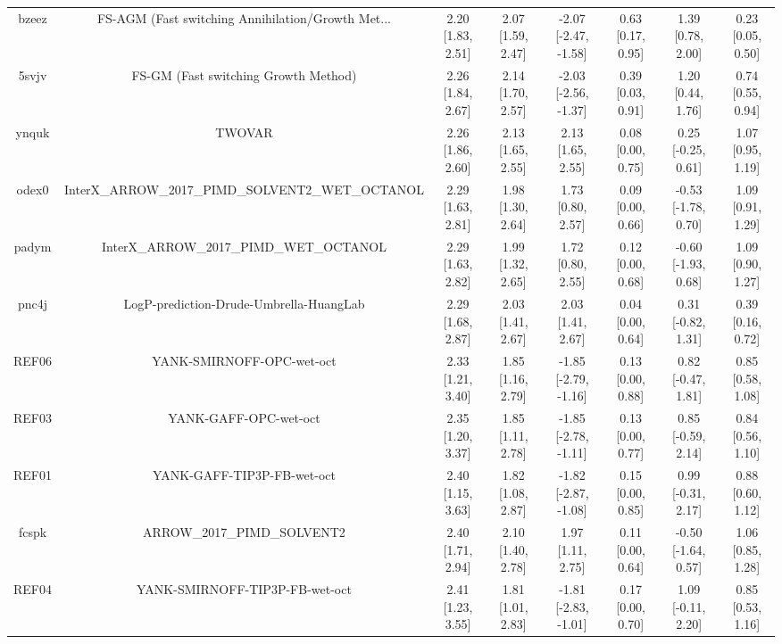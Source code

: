\documentclass{article}
\begin{document}
\begin{center}
\begin{longtable}{|cccccccc|}
 bzeez &  FS-AGM (Fast switching Annihilation/Growth Met... &  2.20 [1.83, 2.51] &  2.07 [1.59, 2.47] &  -2.07 [-2.47, -1.58] &  0.63 [0.17, 0.95] &    1.39 [0.78, 2.00] &     0.23 [0.05, 0.50] \\
 5svjv &               FS-GM (Fast switching Growth Method) &  2.26 [1.84, 2.67] &  2.14 [1.70, 2.57] &  -2.03 [-2.56, -1.37] &  0.39 [0.03, 0.91] &    1.20 [0.44, 1.76] &     0.74 [0.55, 0.94] \\
 ynquk &                                             TWOVAR &  2.26 [1.86, 2.60] &  2.13 [1.65, 2.55] &     2.13 [1.65, 2.55] &  0.08 [0.00, 0.75] &   0.25 [-0.25, 0.61] &     1.07 [0.95, 1.19] \\
 odex0 &  InterX\_ARROW\_2017\_PIMD\_SOLVENT2\_WET\_OCTANOL &  2.29 [1.63, 2.81] &  1.98 [1.30, 2.64] &     1.73 [0.80, 2.57] &  0.09 [0.00, 0.66] &  -0.53 [-1.78, 0.70] &     1.09 [0.91, 1.29] \\
 padym &            InterX\_ARROW\_2017\_PIMD\_WET\_OCTANOL &  2.29 [1.63, 2.82] &  1.99 [1.32, 2.65] &     1.72 [0.80, 2.55] &  0.12 [0.00, 0.68] &  -0.60 [-1.93, 0.68] &     1.09 [0.90, 1.27] \\
 pnc4j &            LogP-prediction-Drude-Umbrella-HuangLab &  2.29 [1.68, 2.87] &  2.03 [1.41, 2.67] &     2.03 [1.41, 2.67] &  0.04 [0.00, 0.64] &   0.31 [-0.82, 1.31] &     0.39 [0.16, 0.72] \\
 REF06 &                          YANK-SMIRNOFF-OPC-wet-oct &  2.33 [1.21, 3.40] &  1.85 [1.16, 2.79] &  -1.85 [-2.79, -1.16] &  0.13 [0.00, 0.88] &   0.82 [-0.47, 1.81] &     0.85 [0.58, 1.08] \\
 REF03 &                              YANK-GAFF-OPC-wet-oct &  2.35 [1.20, 3.37] &  1.85 [1.11, 2.78] &  -1.85 [-2.78, -1.11] &  0.13 [0.00, 0.77] &   0.85 [-0.59, 2.14] &     0.84 [0.56, 1.10] \\
 REF01 &                         YANK-GAFF-TIP3P-FB-wet-oct &  2.40 [1.15, 3.63] &  1.82 [1.08, 2.87] &  -1.82 [-2.87, -1.08] &  0.15 [0.00, 0.85] &   0.99 [-0.31, 2.17] &     0.88 [0.60, 1.12] \\
 fcspk &                        ARROW\_2017\_PIMD\_SOLVENT2 &  2.40 [1.71, 2.94] &  2.10 [1.40, 2.78] &     1.97 [1.11, 2.75] &  0.11 [0.00, 0.64] &  -0.50 [-1.64, 0.57] &     1.06 [0.85, 1.28] \\
 REF04 &                     YANK-SMIRNOFF-TIP3P-FB-wet-oct &  2.41 [1.23, 3.55] &  1.81 [1.01, 2.83] &  -1.81 [-2.83, -1.01] &  0.17 [0.00, 0.70] &   1.09 [-0.11, 2.20] &     0.85 [0.53, 1.16] \\

\end{longtable}
\end{center}
\end{document}
